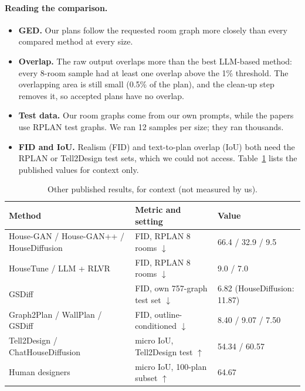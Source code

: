 \documentclass[11pt,a4paper]{article}
\begin{document}
\paragraph{Reading the comparison.}
\begin{itemize}
  \item \textbf{GED.} Our plans follow the requested room graph more closely than
        every compared method at every size.
  \item \textbf{Overlap.} The raw output overlaps more than the best LLM-based
        method: every 8-room sample had at least one overlap above the 1\%
        threshold. The overlapping area is still small (0.5\% of the plan), and
        the clean-up step removes it, so accepted plans have no overlap.
  \item \textbf{Test data.} Our room graphs come from our own prompts, while the
        papers use RPLAN test graphs. We ran 12 samples per size; they ran
        thousands.
  \item \textbf{FID and IoU.} Realism (FID) and text-to-plan overlap (IoU) both
        need the RPLAN or Tell2Design test sets, which we could not access.
        Table~\ref{tab:published} lists the published values for context only.
\end{itemize}

\begin{table}[H]
\centering
\caption{Other published results, for context (not measured by us).}
\label{tab:published}
\small
\begin{tabular}{lll}
\toprule
\textbf{Method} & \textbf{Metric and setting} & \textbf{Value}\\
\midrule
House-GAN / House-GAN++ / HouseDiffusion & FID, RPLAN 8 rooms $\downarrow$ & 66.4 / 32.9 / 9.5\\
HouseTune / LLM + RLVR & FID, RPLAN 8 rooms $\downarrow$ & 9.0 / 7.0\\
GSDiff & FID, own 757-graph test set $\downarrow$ & 6.82 (HouseDiffusion: 11.87)\\
Graph2Plan / WallPlan / GSDiff & FID, outline-conditioned $\downarrow$ & 8.40 / 9.07 / 7.50\\
Tell2Design / ChatHouseDiffusion & micro IoU, Tell2Design test $\uparrow$ & 54.34 / 60.57\\
Human designers & micro IoU, 100-plan subset $\uparrow$ & 64.67\\
\bottomrule
\end{tabular}
\end{table}
\end{document}
